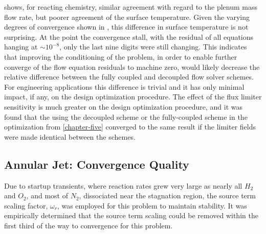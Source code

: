  shows, for reacting chemistry, similar agreement
with regard to the plenum mass flow rate, but poorer agreement of the surface
temperature. Given the varying degrees of convergence shown in
, this difference in surface temperature is not
surprising. At the point the convergence stall, with the residual of all
equations hanging at $\sim 10^{-8}$, only the last nine digits were still
changing.  This indicates that improving the conditioning of the problem, in
order to enable further converge of the flow equation residuals to machine zero,
would likely decrease the relative difference between the fully coupled and
decoupled flow solver schemes.  For engineering applications this difference is
trivial and it has only minimal impact, if any, on the design optimization
procedure.  The effect of the flux limiter sensitivity is much greater on the
design optimization procedure, and it was found that the using the decoupled
scheme or the fully-coupled scheme in the optimization from \cref{chapter-five}
converged to the same result if the limiter fields were made identical between
the schemes.

\subsection{Annular Jet: Convergence Quality}

Due to startup transients, where reaction rates grew very large as nearly all
$H_2$ and $O_2$, and most of $N_2$, dissociated near the stagnation region, the
source term scaling factor, $\omega_r$, was employed for this problem to
maintain stability.  It was empirically determined that the source term scaling
could be removed within the first third of the way to convergence for this
problem.  

